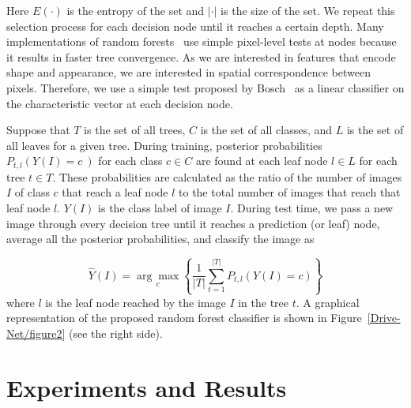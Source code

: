 Here $E(\cdot) $ is the entropy of the set and $\left\vert \cdot\right\vert $ is the size of the set. We repeat this selection process for each decision node until it reaches a certain depth. Many implementations of random forests~\cite{lepetit_Keypoint_2006,winn_Object_2006} use simple pixel-level tests at nodes because it results in faster tree convergence. As we are interested in features that encode shape and appearance, we are interested in spatial correspondence between pixels. Therefore, we use a simple test proposed by Bosch~\cite{bosch_Image_2007} {\textemdash} as a linear classifier on the characteristic vector {\textemdash} at each decision node.

Suppose that $T $ is the set of all trees, $C $ is the set of all classes, and $L $ is the set of all leaves for a given tree. During training, posterior probabilities $P_{t,l}\left(Y\left(I\right)=c\:\right) $ for each class $c\in C $ are found at each leaf node $l\in L $ for each tree $t\in T $. These probabilities are calculated as the ratio of the number of images $I $ of class $c $ that reach a leaf node $l $ to the total number of images that reach that leaf node $l $. $Y\left(I\right) $ is the class label of image $I $. During test time, we pass a new image through every decision tree until it reaches a prediction (or leaf) node, average all the posterior probabilities, and classify the image as

\begin{equation}
    \label{eq:drivenet.yhat}
    \widehat Y(I) = \underset c {\arg \max} \left\{\frac{1}{\left\vert T\right\vert}\sum_{t=1}^{\left\vert T\right\vert} P_{t,l} (Y(I) = c) \right\}
\end{equation}
where $l $ is the leaf node reached by the image $I $ in the tree $t $. A graphical representation of the proposed random forest classifier is shown in Figure~\ref{Drive-Net/figure2}  (see the right side).
\pagebreak

\section{Experiments and Results}

